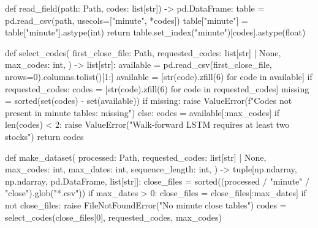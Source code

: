\documentclass[UTF8,a4paper,fontset=fandol]{ctexart}
\begin{document}
\begin{ProjectCode}
def read_field(path: Path, codes: list[str]) -> pd.DataFrame:
    table = pd.read_csv(path, usecols=["minute", *codes])
    table["minute"] = table["minute"].astype(int)
    return table.set_index("minute")[codes].astype(float)


def select_codes(
    first_close_file: Path,
    requested_codes: list[str] | None,
    max_codes: int,
) -> list[str]:
    available = pd.read_csv(first_close_file, nrows=0).columns.tolist()[1:]
    available = [str(code).zfill(6) for code in available]
    if requested_codes:
        codes = [str(code).zfill(6) for code in requested_codes]
        missing = sorted(set(codes) - set(available))
        if missing:
            raise ValueError(f"Codes not present in minute tables: {missing}")
    else:
        codes = available[:max_codes]
    if len(codes) < 2:
        raise ValueError("Walk-forward LSTM requires at least two stocks")
    return codes


def make_dataset(
    processed: Path,
    requested_codes: list[str] | None,
    max_codes: int,
    max_dates: int,
    sequence_length: int,
) -> tuple[np.ndarray, np.ndarray, pd.DataFrame, list[str]]:
    close_files = sorted((processed / "minute" / "close").glob("*.csv"))
    if max_dates > 0:
        close_files = close_files[:max_dates]
    if not close_files:
        raise FileNotFoundError("No minute close tables")
    codes = select_codes(close_files[0], requested_codes, max_codes)


\end{ProjectCode}
\end{document}
